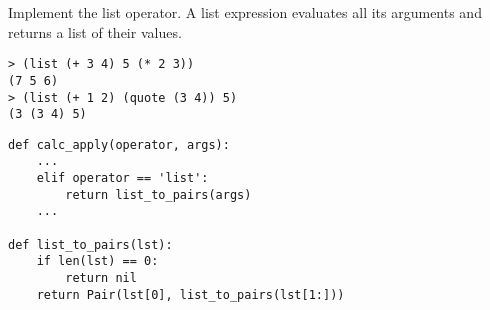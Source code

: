 \question Implement the list operator. A list expression evaluates all its
arguments and returns a list of their values.

\begin{lstlisting}
> (list (+ 3 4) 5 (* 2 3))
(7 5 6)
> (list (+ 1 2) (quote (3 4)) 5)
(3 (3 4) 5)
\end{lstlisting}
\begin{solution}[1.5in]
\begin{lstlisting}
def calc_apply(operator, args):
    ...
    elif operator == 'list':
        return list_to_pairs(args)
    ...

def list_to_pairs(lst):
    if len(lst) == 0:
        return nil
    return Pair(lst[0], list_to_pairs(lst[1:]))
\end{lstlisting}
\end{solution}